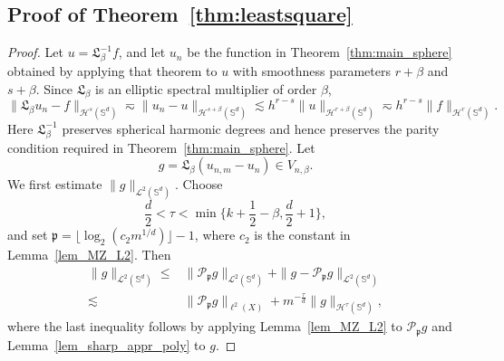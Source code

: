 \documentclass{article}
\numberwithin{equation}{section}
\def\SS{\mathbb{S}}
\begin{document}
\subsection{Proof of Theorem~\ref{thm:leastsquare}}
\begin{proof}
Let $u=\mathfrak L_\beta^{-1}f$, and let $u_n$ be the function in Theorem~\ref{thm:main_sphere} obtained by applying that theorem to $u$ with smoothness parameters $r+\beta$ and $s+\beta$. Since $\mathfrak L_\beta$ is an elliptic spectral multiplier of order $\beta$,
\begin{equation}\label{eqn_net_appr_u}
    \|\mathfrak L_\beta u_n-f\|_{\mathcal H^s(\SS^d)}
    \eqsim\|u_n-u\|_{\mathcal H^{s+\beta}(\SS^d)}
    \lesssim h^{r-s}\|u\|_{\mathcal H^{r+\beta}(\SS^d)}
    \eqsim h^{r-s}\|f\|_{\mathcal H^r(\SS^d)}.
\end{equation}
Here $\mathfrak L_\beta^{-1}$ preserves spherical harmonic degrees and hence preserves the parity condition required in Theorem~\ref{thm:main_sphere}. Let
\begin{equation*}
    g=\mathfrak L_\beta(u_{n,m}-u_n)\in V_{n,\beta}.
\end{equation*}
We first estimate $\|g\|_{\mathcal L^2(\SS^d)}$. Choose
$$
\frac d2<\tau<\min\big\{k+\frac12-\beta,\frac{d}{2}+1\big\},
$$
and set $\mathfrak p=\lfloor\log_2(c_2m^{1/d})\rfloor-1$, where $c_2$ is the constant in Lemma~\ref{lem_MZ_L2}. Then
\begin{equation}\label{eqn_samp_step1}
    \begin{split}
        \|g\|_{\mathcal L^2(\SS^d)}
        \leq&\|\mathcal P_{\mathfrak p}g\|_{\mathcal L^2(\SS^d)}
        +\|g-\mathcal P_{\mathfrak p}g\|_{\mathcal L^2(\SS^d)}\\
        \lesssim&\|\mathcal P_{\mathfrak p}g\|_{\ell^2(X)}
        +m^{-\frac{\tau}{d}}\|g\|_{\mathcal H^\tau(\SS^d)},
    \end{split}
\end{equation}
where the last inequality follows by applying Lemma~\ref{lem_MZ_L2} to $\mathcal P_{\mathfrak p}g$ and Lemma~\ref{lem_sharp_appr_poly} to $g$.


\end{proof}
\end{document}
